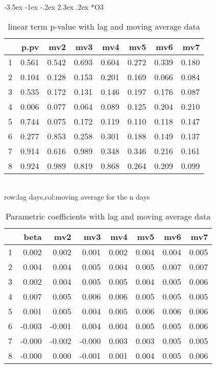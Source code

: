 \documentclass[a4paper, 12pt]{article}
\makeatletter
\def\large{\fontsize{14}{20}\selectfont}
\renewcommand\subsection{\@startsection {subsection}{1}{\z@}%
                                   {-3.5ex \@plus -1ex \@minus -.2ex}%
                                   {2.3ex \@plus.2ex}%
                                   {\centering\normalfont\large\bfseries}}
\makeatother
\begin{document}
\subsection*{O3}
\begin{table}[h]
\centering
\caption{linear term p-value with lag and moving average data}
\begin{tabular}{rrrrrrrr}
  \hline
 & p.pv & mv2 & mv3 & mv4 & mv5 & mv6 & mv7 \\
  \hline
1 & 0.561 & 0.542 & 0.693 & 0.604 & 0.272 & 0.339 & 0.180 \\
  2 & 0.104 & 0.128 & 0.153 & 0.201 & 0.169 & 0.066 & 0.084 \\
  3 & 0.535 & 0.172 & 0.131 & 0.146 & 0.197 & 0.176 & 0.087 \\
  4 & 0.006 & 0.077 & 0.064 & 0.089 & 0.125 & 0.204 & 0.210 \\
  5 & 0.744 & 0.075 & 0.172 & 0.119 & 0.110 & 0.118 & 0.147 \\
  6 & 0.277 & 0.853 & 0.258 & 0.301 & 0.188 & 0.149 & 0.137 \\
  7 & 0.914 & 0.616 & 0.989 & 0.348 & 0.346 & 0.216 & 0.161 \\
  8 & 0.924 & 0.989 & 0.819 & 0.868 & 0.264 & 0.209 & 0.099 \\
   \hline
\end{tabular}
\\row:lag days,col:moving average for the n days
\end{table}

\begin{table}[h]
\centering
\caption{Parametric coefficients with lag and moving average data}
\begin{tabular}{rrrrrrrr}
  \hline
 & beta & mv2 & mv3 & mv4 & mv5 & mv6 & mv7 \\
  \hline
1 & 0.002 & 0.002 & 0.001 & 0.002 & 0.004 & 0.004 & 0.005 \\
  2 & 0.004 & 0.004 & 0.005 & 0.004 & 0.005 & 0.007 & 0.007 \\
  3 & 0.002 & 0.004 & 0.005 & 0.005 & 0.004 & 0.005 & 0.006 \\
  4 & 0.007 & 0.005 & 0.006 & 0.006 & 0.005 & 0.005 & 0.005 \\
  5 & 0.001 & 0.005 & 0.004 & 0.005 & 0.006 & 0.006 & 0.006 \\
  6 & -0.003 & -0.001 & 0.004 & 0.004 & 0.005 & 0.005 & 0.006 \\
  7 & -0.000 & -0.002 & -0.000 & 0.003 & 0.003 & 0.005 & 0.005 \\
  8 & -0.000 & 0.000 & -0.001 & 0.001 & 0.004 & 0.005 & 0.006 \\
   \hline
\end{tabular}
\end{table}
\end{document}
